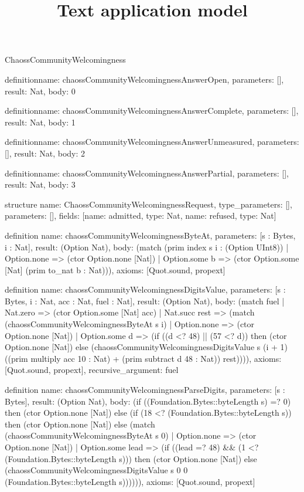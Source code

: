 \begin{lexlean}{ChaossCommunityWelcomingness}
\title{Text application model}
\begin{semanticmodule}
definition{name: chaossCommunityWelcomingnessAnswerOpen, parameters: [], result: Nat, body: 0}

definition{name: chaossCommunityWelcomingnessAnswerComplete, parameters: [], result: Nat, body: 1}

definition{name: chaossCommunityWelcomingnessAnswerUnmeasured, parameters: [], result: Nat, body: 2}

definition{name: chaossCommunityWelcomingnessAnswerPartial, parameters: [], result: Nat, body: 3}

structure{
  name: ChaossCommunityWelcomingnessRequest,
  type_parameters: [],
  parameters: [],
  fields: [{name: admitted, type: Nat}, {name: refused, type: Nat}]
}

definition{
  name: chaossCommunityWelcomingnessByteAt,
  parameters: [s : Bytes, i : Nat],
  result: (Option Nat),
  body: (match (prim index s i : (Option UInt8))
    | Option.none => (ctor Option.none [Nat])
    | Option.some b => (ctor Option.some [Nat] (prim to_nat b : Nat))),
  axioms: [Quot.sound, propext]
}

definition{
  name: chaossCommunityWelcomingnessDigitsValue,
  parameters: [s : Bytes, i : Nat, acc : Nat, fuel : Nat],
  result: (Option Nat),
  body: (match fuel
    | Nat.zero => (ctor Option.some [Nat] acc)
    | Nat.succ rest => (match (chaossCommunityWelcomingnessByteAt s i)
      | Option.none => (ctor Option.none [Nat])
      | Option.some d => (if ((d <? 48) || (57 <? d)) then (ctor Option.none [Nat]) else (chaossCommunityWelcomingnessDigitsValue s (i + 1) ((prim multiply acc 10 : Nat) + (prim subtract d 48 : Nat)) rest)))),
  axioms: [Quot.sound, propext],
  recursive_argument: fuel
}

definition{
  name: chaossCommunityWelcomingnessParseDigits,
  parameters: [s : Bytes],
  result: (Option Nat),
  body: (if ((Foundation.Bytes::byteLength s) =? 0) then (ctor Option.none [Nat]) else (if (18 <? (Foundation.Bytes::byteLength s)) then (ctor Option.none [Nat]) else (match (chaossCommunityWelcomingnessByteAt s 0)
    | Option.none => (ctor Option.none [Nat])
    | Option.some lead => (if ((lead =? 48) && (1 <? (Foundation.Bytes::byteLength s))) then (ctor Option.none [Nat]) else (chaossCommunityWelcomingnessDigitsValue s 0 0 (Foundation.Bytes::byteLength s)))))),
  axioms: [Quot.sound, propext]
}


\end{semanticmodule}
\end{lexlean}
